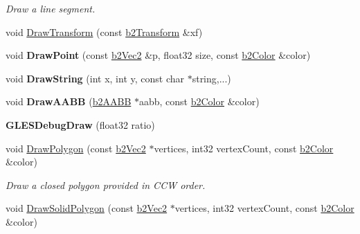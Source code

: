 \begin{DoxyCompactItemize}
\begin{DoxyCompactList}\small\item\em Draw a line segment. \end{DoxyCompactList}\item 
void \hyperlink{class_g_l_e_s_debug_draw_a2306fb12b6f6e69d84fcb79bcddfcfbf}{Draw\-Transform} (const \hyperlink{structb2_transform}{b2\-Transform} \&xf)
\item 
\hypertarget{class_g_l_e_s_debug_draw_a84ce73b36e8b9e2843b2deacebeee839}{void {\bfseries Draw\-Point} (const \hyperlink{structb2_vec2}{b2\-Vec2} \&p, float32 size, const \hyperlink{structb2_color}{b2\-Color} \&color)}\label{class_g_l_e_s_debug_draw_a84ce73b36e8b9e2843b2deacebeee839}

\item 
\hypertarget{class_g_l_e_s_debug_draw_a16aaca99009b9423fe288b5815c8dbcf}{void {\bfseries Draw\-String} (int x, int y, const char $\ast$string,...)}\label{class_g_l_e_s_debug_draw_a16aaca99009b9423fe288b5815c8dbcf}

\item 
\hypertarget{class_g_l_e_s_debug_draw_a6dc5d6adbc8279c9d378311b66ddcf53}{void {\bfseries Draw\-A\-A\-B\-B} (\hyperlink{structb2_a_a_b_b}{b2\-A\-A\-B\-B} $\ast$aabb, const \hyperlink{structb2_color}{b2\-Color} \&color)}\label{class_g_l_e_s_debug_draw_a6dc5d6adbc8279c9d378311b66ddcf53}

\item 
\hypertarget{class_g_l_e_s_debug_draw_a658e964ffb386b8b67fb5a3bc5db27a3}{{\bfseries G\-L\-E\-S\-Debug\-Draw} (float32 ratio)}\label{class_g_l_e_s_debug_draw_a658e964ffb386b8b67fb5a3bc5db27a3}

\item 
\hypertarget{class_g_l_e_s_debug_draw_afab4f8ea8882119f62134f9667e9e2da}{void \hyperlink{class_g_l_e_s_debug_draw_afab4f8ea8882119f62134f9667e9e2da}{Draw\-Polygon} (const \hyperlink{structb2_vec2}{b2\-Vec2} $\ast$vertices, int32 vertex\-Count, const \hyperlink{structb2_color}{b2\-Color} \&color)}\label{class_g_l_e_s_debug_draw_afab4f8ea8882119f62134f9667e9e2da}

\begin{DoxyCompactList}\small\item\em Draw a closed polygon provided in C\-C\-W order. \end{DoxyCompactList}\item 
\hypertarget{class_g_l_e_s_debug_draw_aa68490f03cf0cb567ce6ccd78b18c5c3}{void \hyperlink{class_g_l_e_s_debug_draw_aa68490f03cf0cb567ce6ccd78b18c5c3}{Draw\-Solid\-Polygon} (const \hyperlink{structb2_vec2}{b2\-Vec2} $\ast$vertices, int32 vertex\-Count, const \hyperlink{structb2_color}{b2\-Color} \&color)}\label{class_g_l_e_s_debug_draw_aa68490f03cf0cb567ce6ccd78b18c5c3}


\end{DoxyCompactItemize}
